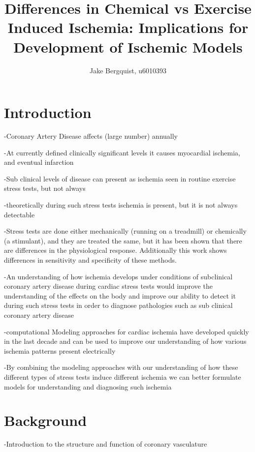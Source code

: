 \documentclass[12pt]{article}
\begin{document}
\title{Differences in Chemical vs Exercise Induced Ischemia: Implications for Development of Ischemic Models }

\author{Jake Bergquist, u6010393}
\maketitle

\section{Introduction}

-Coronary Artery Disease affects (large number) annually

-At currently defined clinically significant levels it causes myocardial ischemia, and eventual infarction

-Sub clinical levels of disease can present as ischemia seen in routine exercise stress tests, but not always

-theoretically during such stress tests ischemia is present, but it is not always detectable

-Stress tests are done either mechanically (running on a treadmill) or chemically (a stimulant), and they are treated the same, but it has been shown that there are differences in the physiological response.\cite{Beleslin1994} Additionally this work shows differences in sensitivity and specificity of these methods.

-An understanding of how ischemia develops under conditions of subclinical coronary artery disease during cardiac stress tests would improve the understanding of the effects on the body and improve our ability to detect it during such stress tests in order to diagnose pathologies such as sub clinical coronary artery disease

-computational Modeling approaches for cardiac ischemia have developed quickly in the last decade and can be used to improve our understanding of how various ischemia patterns present electrically

-By combining the modeling approaches with our understanding of how these different types of stress tests induce different ischemia we can better formulate models for understanding and diagnosing such ischemia

\section{Background}

-Introduction to the structure and function of coronary vasculature
\end{document}
